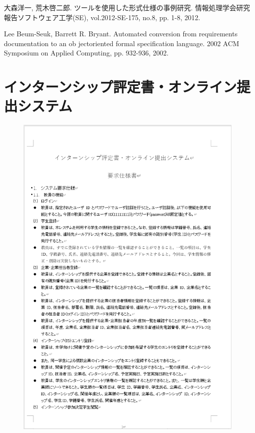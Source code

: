 \documentclass[uplatex, report, a4j, 10pt]{jsbook}
\begin{document}
\begin{thebibliography}{10}
    大森洋一, 荒木啓二郎. 
    ツールを使用した形式仕様の事例研究. 
    情報処理学会研究報告ソフトウェア工学(SE), 
    vol.2012-SE-175, no.8, pp. 1-8, 2012.

    Lee Beum-Seuk, Barrett R. Bryant. 
    Automated conversion from requirements documentation to an ob jectoriented formal speciﬁcation language. 
    2002 ACM Symposium on Applied Computing, pp. 932-936, 2002.

\end{thebibliography}

\appendix  %

\chapter{インターンシップ評定書・オンライン提出システム}\label{ET_Specifications}

\begin{figure}[tp]
    \begin{center}
    \includegraphics[width=\hsize]{specification/internship_1.eps}
    \end{center}
\end{figure}
\end{document}
